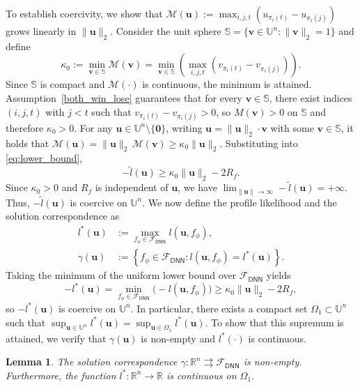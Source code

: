 \documentclass[
  12pt]{article}
\newtheorem{lemma}{Lemma}
\begin{document}
\noindent To establish coercivity, we show that $\mathcal{M}(\boldsymbol{u}) := \max_{i,j,t}(u_{\pi_i(t)} - u_{\pi_i(j)})$ grows linearly in $\|\boldsymbol{u}\|_2$. Consider the unit sphere $\mathbb{S} = \{\boldsymbol{v} \in \mathbb{U}^n : \|\boldsymbol{v}\|_2 = 1\}$ and define
$$ \kappa_0 := \min_{\boldsymbol{v} \in \mathbb{S}} \mathcal{M}(\boldsymbol{v}) = \min_{\boldsymbol{v} \in \mathbb{S}} \left( \max_{i, j, t} (v_{\pi_i(t)} - v_{\pi_i(j)}) \right). $$
Since $\mathbb{S}$ is compact and $\mathcal{M}(\cdot)$ is continuous, the minimum is attained. Assumption~\ref{both_win_lose} guarantees that for every $\boldsymbol{v} \in \mathbb{S}$, there exist indices $(i,j,t)$ with $j < t$ such that $v_{\pi_i(t)} - v_{\pi_i(j)} > 0$, so $M(\boldsymbol{v}) > 0$ on $\mathbb{S}$ and therefore $\kappa_0> 0$. For any $\boldsymbol{u} \in \mathbb{U}^n \setminus \{\mathbf{0}\}$, writing $\boldsymbol{u} = \|\boldsymbol{u}\|_2 \cdot \boldsymbol{v}$ with some $\boldsymbol{v} \in \mathbb{S}$, it holds that $\mathcal{M}(\boldsymbol{u}) = \|\boldsymbol{u}\|_2\, \mathcal{M}(\boldsymbol{v}) \geq \kappa_0\|\boldsymbol{u}\|_2$. Substituting into \eqref{eq:lower_bound},
$$ -\widetilde{l}(\boldsymbol{u}) \geq \kappa_0 \|\boldsymbol{u}\|_2 - 2R_f. $$
Since $\kappa_0 > 0$ and $R_f$ is independent of $\boldsymbol{u}$, we have $\lim_{\|\boldsymbol{u}\| \to \infty} -\widetilde{l}(\boldsymbol{u}) = +\infty$. Thus, $-\tilde{l}(\boldsymbol{u})$ is coercive on $\mathbb{U}^n$. We now define the profile likelihood and the solution correspondence as
$$\begin{aligned}
l^*(\boldsymbol{u}) &:=\max _{f_\phi\in \mathcal{F}_{\mathsf{DNN}}} l(\boldsymbol{u}, f_\phi),\\
\gamma(\boldsymbol{u}) &:= \left\{f_\phi\in \mathcal{F}_{\mathsf{DNN}}: l(\boldsymbol{u},f_{\phi})  = l^*(\boldsymbol{u})\right\}.
\end{aligned}$$
Taking the minimum of the uniform lower bound over $\mathcal{F}_{\mathsf{DNN}}$ yields
$$-l^*(\boldsymbol{u}) = \min_{f_\phi \in \mathcal{F}_{\mathsf{DNN}}} \bigl(-l(\boldsymbol{u}, f_\phi)\bigr) \geq \kappa_0\|\boldsymbol{u}\|_2 - 2R_f,$$
so $-l^*(\boldsymbol{u})$ is coercive on $\mathbb{U}^n$. In particular, there exists a compact set $\Omega_1 \subset \mathbb{U}^n$ such that $\sup_{\boldsymbol{u} \in \mathbb{U}^n} l^*(\boldsymbol{u}) = \sup_{\boldsymbol{u} \in \Omega_1} l^*(\boldsymbol{u})$. To show that this supremum is attained, we verify that $\gamma(\boldsymbol{u})$ is non-empty and $l^*(\cdot)$ is continuous.

\begin{lemma}\label{berger_max}
The solution correspondence $\gamma : \mathbb{R}^n \rightrightarrows \mathcal{F}_{\mathsf{DNN}}$ is non-empty. Furthermore, the function $l^* : \mathbb{R}^n \to \mathbb{R}$ is continuous on $\Omega_1$. 
\end{lemma}
\end{document}
